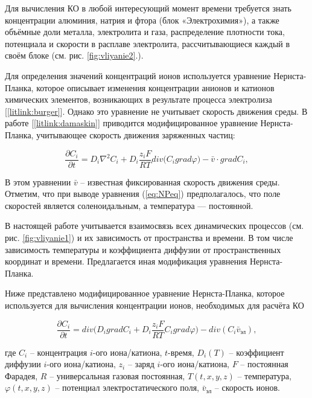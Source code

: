 \documentclass[]{pmi}
\def\phi{\varphi}
\begin{document}
Для вычисления КО в любой интересующий момент времени требуется знать концентрации алюминия, натрия и фтора (блок «Электрохимия»), а также объёмные доли металла, электролита и газа, распределение плотности тока, потенциала и скорости в расплаве электролита, рассчитывающиеся каждый в своём блоке (см. рис. \ref{fig:vliyanie2}.). 

Для определения значений концентраций ионов используется уравнение Нернста-Планка, которое описывает изменения концентрации анионов и катионов химических элементов, возникающих в результате процесса электролиза [\ref{litlink:burger}]. Однако это уравнение не учитывает скорость движения среды. В работе [\ref{litlink:damaskin}] приводится модифицированное уравнение Нернста-Планка, учитывающее скорость движения заряженных частиц:

\begin{equation}\label{eq:NPeq}
\frac{\partial C_i}{\partial t} = D_i\nabla^{2}C_i+D_i\frac{z_iF}{RT}div\big(C_i grad\phi\big) - \bar{v} \cdot gradC_i,
\end{equation}

В этом уравнении $\bar{v}$ – известная фиксированная скорость движения среды. Отметим, что при выводе уравнения (\ref{eq:NPeq}) предполагалось, что поле скоростей является соленоидальным, а температура --- постоянной. 

В настоящей работе учитывается взаимосвязь всех динамических процессов (см. рис. \ref{fig:vliyanie1}) и их зависимость от пространства и времени. В том числе зависимость температуры и коэффициента диффузии от пространственных координат и времени. Предлагается иная модификация уравнения Нернста-Планка. 


Ниже представлено модифицированное уравнение Нернста-Планка, которое используется для вычисления концентрации ионов, необходимых для расчёта КО

\begin{equation}\label{eq:NPeqmod}
\frac{\partial C_i}{\partial t} = div\bigg(D_i gradC_i + D_i \frac{z_iF}{RT}C_igrad\phi\bigg) - div(C_i \bar{v}_{\text{эл}}),
\end{equation}

где $C_i$ – концентрация $i$-ого иона/катиона, $t$-время, $D_i (T)$ – коэффициент диффузии $i$-ого иона/катиона, $z_i$ – заряд $i$-ого иона/катиона, $F$ – постоянная Фарадея, $R$ – универсальная газовая постоянная, $T(t,x,y,z)$ – температура, $\phi (t,x,y,z)$ – потенциал электростатического поля, $\bar{v}_\text{эл}$ – скорость ионов.
\end{document}
